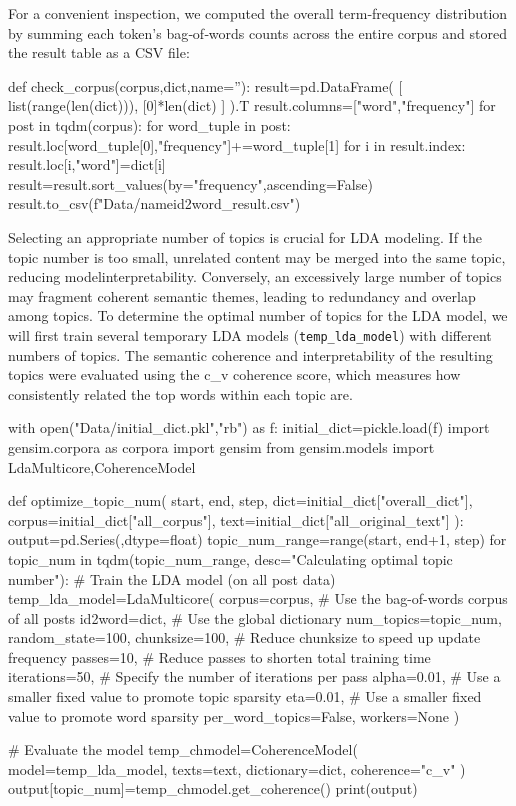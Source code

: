 \documentclass[12pt]{article}
\numberwithin{figure}{section}  %
\begin{document}
	For a convenient inspection, we computed the overall term‐frequency
	distribution by summing each token’s bag‐of‐words counts across the entire
	corpus and stored the result table as a CSV file:
	\begin{python}
def check_corpus(corpus,dict,name=''):
    result=pd.DataFrame(
        [
            list(range(len(dict))),
            [0]*len(dict)
        ]
    ).T
    result.columns=["word","frequency"]
    for post in tqdm(corpus):
        for word_tuple in post:
            result.loc[word_tuple[0],"frequency"]+=word_tuple[1]
    for i in result.index:
        result.loc[i,"word"]=dict[i]
    result=result.sort_values(by="frequency",ascending=False)
    result.to_csv(f"Data/{name}id2word_result.csv")
	\end{python}
	
	Selecting an appropriate number of topics is crucial for LDA modeling. If
	the topic number is too small, unrelated content may be merged into the same
	topic, reducing modelinterpretability. Conversely, an excessively large number of
	topics may fragment coherent semantic themes, leading to redundancy and
	overlap among topics. To determine the optimal number of topics for the LDA
	model, we will first train several temporary LDA models (\texttt{temp\_lda\_model}) with different
	numbers of topics. The semantic coherence and interpretability of the
	resulting topics were evaluated using the c\_v coherence score, which
	measures how consistently related the top words within each topic are. 
	\begin{python}
with open("Data/initial_dict.pkl","rb") as f:
    initial_dict=pickle.load(f)
import gensim.corpora as corpora
import gensim
from gensim.models import LdaMulticore,CoherenceModel

def optimize_topic_num(
  start,
  end,
  step,
  dict=initial_dict["overall_dict"],
  corpus=initial_dict["all_corpus"],
  text=initial_dict["all_original_text"]      
):
  output=pd.Series({},dtype=float)
  topic_num_range=range(start, end+1, step)
  for topic_num in tqdm(topic_num_range, desc="Calculating optimal topic number"):
    # Train the LDA model (on all post data)
    temp_lda_model=LdaMulticore(
        corpus=corpus,    # Use the bag-of-words corpus of all posts
        id2word=dict,     # Use the global dictionary
        num_topics=topic_num,
        random_state=100,
        chunksize=100,    # Reduce chunksize to speed up update frequency
        passes=10,        # Reduce passes to shorten total training time
        iterations=50,    # Specify the number of iterations per pass
        alpha=0.01,       # Use a smaller fixed value to promote topic sparsity
        eta=0.01,         # Use a smaller fixed value to promote word sparsity
        per_word_topics=False,  
        workers=None                    
    )

    # Evaluate the model 
    temp_chmodel=CoherenceModel(
        model=temp_lda_model,
        texts=text,
        dictionary=dict,
        coherence="c_v"
    )
    output[topic_num]=temp_chmodel.get_coherence()
  print(output)
	\end{python}
	
\end{document}
